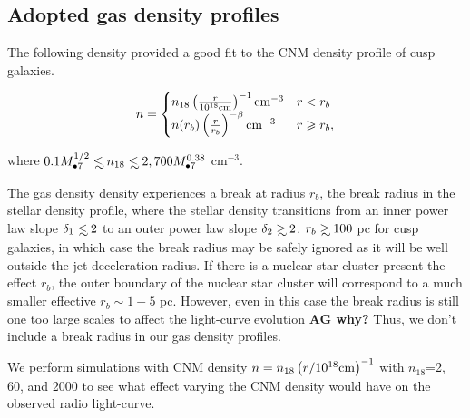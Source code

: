 \documentclass[usenatbib,fleqn]{mnras}
\newcommand\lsim{\mathrel{\rlap{\lower4pt\hbox{\hskip1pt$\sim$}}
    \raise1pt\hbox{$<$}}}
\newcommand\gsim{\mathrel{\rlap{\lower4pt\hbox{\hskip1pt$\sim$}}
    \raise1pt\hbox{$>$}}}
\newcommand{\Mbh}[1][]{M_{\bullet#1}}
\begin{document}
\subsection{Adopted gas density profiles}
 The following density provided a good fit to the CNM density profile
 of cusp galaxies.

\begin{align}
n=
\begin{cases}
  n_{18} \left(\frac{r}{10^{18} {\rm cm}}\right)^{-1} {\rm cm^{-3}} & r<r_b \\
  n(r_b) \left(\frac{r}{r_b}\right)^{-\beta} {\rm cm^{-3}} & r\geq
  r_b,\\
  \label{eq:profile}
\end{cases}
\end{align}

where $0.1 \Mbh[7]^{1/2} \lsim n_{\rm 18}\lsim 2,700
\Mbh[7]^{0.38} $ cm$^{-3}$.  

The gas density density experiences a break at radius $r_b$, the break
radius in the stellar density profile, where the stellar density
transitions from an inner power law slope $\delta_1\lsim 2$ to an outer
power law slope $\delta_2\gsim 2$. $r_b\gsim 100$ pc for cusp galaxies,
in which case the break radius may be safely ignored as it will be
well outside the jet deceleration radius. If there is a nuclear
star cluster present the effect $r_b$, the outer boundary of the
nuclear star cluster will correspond to a much smaller effective
$r_b\sim 1-5$ pc. However, even in this case the break radius is still
one too large scales to affect the light-curve evolution {\bf AG why?}
Thus, we don't include a break radius in our gas density profiles.

We perform simulations with CNM density $n=n_{18} \left(r/10^{18} {\rm
  cm}\right)^{-1}$ with $n_{18}$=2, 60, and 2000 to see what effect
varying the CNM density would have on the observed radio light-curve.


\end{document}
